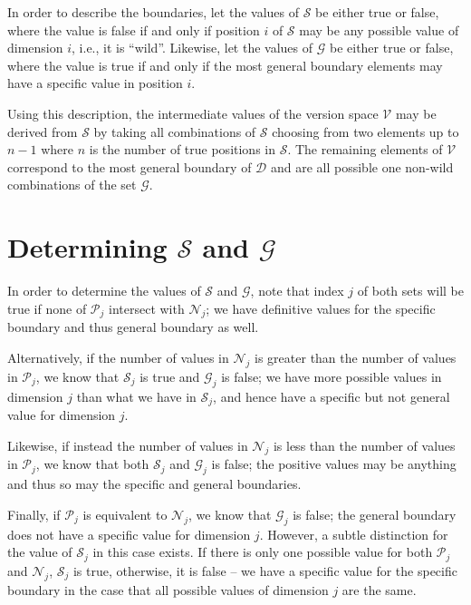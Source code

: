 In order to describe the boundaries, let the values of $\mathcal{S}$ be either true or false, where the value is false if and only if position $i$ of $\mathcal{S}$ may be any possible value of dimension $i$, i.e., it is ``wild''.  Likewise, let the values of $\mathcal{G}$ be either true or false, where the value is true if and only if the most general boundary elements may have a specific value in position $i$.

Using this description, the intermediate values of the version space $\mathcal{V}$ may be derived from $\mathcal{S}$ by taking all combinations of $\mathcal{S}$ choosing from two elements up to $n-1$ where $n$ is the number of true positions in $\mathcal{S}$.  The remaining elements of $\mathcal{V}$ correspond to the most general boundary of $\mathcal{D}$ and are all possible one non-wild combinations of the set $\mathcal{G}$.

\section*{Determining $\mathcal{S}$ and $\mathcal{G}$}

In order to determine the values of $\mathcal{S}$ and $\mathcal{G}$, note that index $j$ of both sets will be true if none of $\mathcal{P}_j$ intersect with $\mathcal{N}_j$; we have definitive values for the specific boundary and thus general boundary as well.  

Alternatively, if the number of values in $\mathcal{N}_j$ is greater than the number of values in $\mathcal{P}_j$, we know that $\mathcal{S}_j$ is true and $\mathcal{G}_j$ is false; we have more possible values in dimension $j$ than what we have in $\mathcal{S}_j$, and hence have a specific but not general value for dimension $j$.  

Likewise, if instead the number of values in $\mathcal{N}_j$ is less than the number of values in $\mathcal{P}_j$, we know that both $\mathcal{S}_j$ and $\mathcal{G}_j$ is false; the positive values may be anything and thus so may the specific and general boundaries.  

Finally, if $\mathcal{P}_j$ is equivalent to $\mathcal{N}_j$, we know that $\mathcal{G}_j$ is false; the general boundary does not have a specific value for dimension $j$.  However, a subtle distinction for the value of $\mathcal{S}_j$ in this case exists.  If there is only one possible value for both $\mathcal{P}_j$ and $\mathcal{N}_j$, $\mathcal{S}_j$ is true, otherwise, it is false -- we have a specific value for the specific boundary in the case that all possible values of dimension $j$ are the same.

